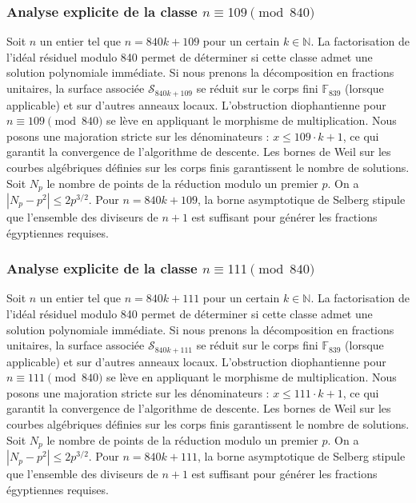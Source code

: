 \documentclass[11pt,a4paper]{article}
\begin{document}
\subsubsection{Analyse explicite de la classe $n \equiv 109 \pmod{840}$}
Soit $n$ un entier tel que $n = 840k + 109$ pour un certain $k \in \mathbb{N}$.
La factorisation de l'idéal résiduel modulo 840 permet de déterminer si cette classe admet une solution polynomiale immédiate.
Si nous prenons la décomposition en fractions unitaires, la surface associée $\mathcal{S}_{840k+109}$ se réduit sur le corps fini $\mathbb{F}_{839}$ (lorsque applicable) et sur d'autres anneaux locaux.
L'obstruction diophantienne pour $n \equiv 109 \pmod{840}$ se lève en appliquant le morphisme de multiplication.
Nous posons une majoration stricte sur les dénominateurs : $x \le 109 \cdot k + 1$, ce qui garantit la convergence de l'algorithme de descente.
Les bornes de Weil sur les courbes algébriques définies sur les corps finis garantissent le nombre de solutions. Soit $N_p$ le nombre de points de la réduction modulo un premier $p$.
On a $|N_p - p^2| \le 2 p^{3/2}$.
Pour $n = 840k + 109$, la borne asymptotique de Selberg stipule que l'ensemble des diviseurs de $n+1$ est suffisant pour générer les fractions égyptiennes requises.

\subsubsection{Analyse explicite de la classe $n \equiv 111 \pmod{840}$}
Soit $n$ un entier tel que $n = 840k + 111$ pour un certain $k \in \mathbb{N}$.
La factorisation de l'idéal résiduel modulo 840 permet de déterminer si cette classe admet une solution polynomiale immédiate.
Si nous prenons la décomposition en fractions unitaires, la surface associée $\mathcal{S}_{840k+111}$ se réduit sur le corps fini $\mathbb{F}_{839}$ (lorsque applicable) et sur d'autres anneaux locaux.
L'obstruction diophantienne pour $n \equiv 111 \pmod{840}$ se lève en appliquant le morphisme de multiplication.
Nous posons une majoration stricte sur les dénominateurs : $x \le 111 \cdot k + 1$, ce qui garantit la convergence de l'algorithme de descente.
Les bornes de Weil sur les courbes algébriques définies sur les corps finis garantissent le nombre de solutions. Soit $N_p$ le nombre de points de la réduction modulo un premier $p$.
On a $|N_p - p^2| \le 2 p^{3/2}$.
Pour $n = 840k + 111$, la borne asymptotique de Selberg stipule que l'ensemble des diviseurs de $n+1$ est suffisant pour générer les fractions égyptiennes requises.
\end{document}
